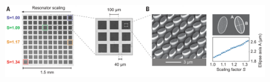 \begin{frame}[c]
\begin{figure}[H]
        \centering %
        \includegraphics[width=1.\textwidth]{figures/Imaging-based molecular barcoding with pixelated dielectric metasurfaces_2.png} %
    \end{figure}
\end{frame}